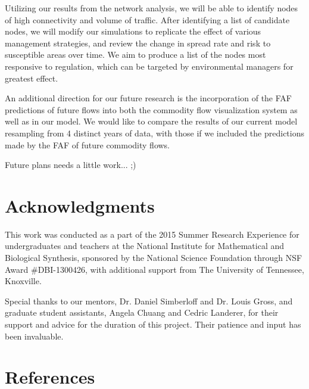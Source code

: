 \documentclass[12pt]{article}
\begin{document}
Utilizing our results from the network analysis, we will be able to identify nodes of high connectivity and volume of traffic. After identifying a list of candidate nodes, we will modify our simulations to replicate the effect of various management strategies, and review the change in spread rate and risk to susceptible areas over time. We aim to produce a list of the nodes most responsive to regulation, which can be targeted by environmental managers for greatest effect.

An additional direction for our future research is the incorporation of the FAF predictions of future flows into both the commodity flow visualization system as well as in our model. We would like to compare the results of our current model resampling from 4 distinct years of data, with those if we included the predictions made by the FAF of future commodity flows.

Future plans needs a little work... ;)

\section*{Acknowledgments}
This work was conducted as a part of the 2015 Summer Research Experience for undergraduates and teachers at the National Institute for Mathematical and Biological Synthesis, sponsored by the National Science Foundation through NSF Award \#DBI-1300426, with additional support from The University of Tennessee, Knoxville.

Special thanks to our mentors, Dr. Daniel Simberloff and Dr. Louis Gross, and graduate student assistants, Angela Chuang and Cedric Landerer, for their support and advice for the duration of this project.  Their patience and input has been invaluable. 

\section*{References}
\end{document}
